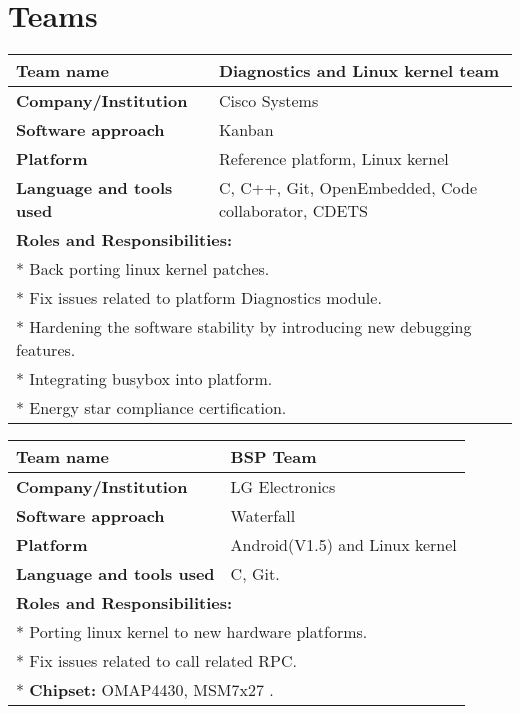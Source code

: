 \documentclass[letterpaper]{twentysecondcv} %
\begin{document}
\section{Teams}
\vspace{1mm}
\begin{tabular}{ |p{7cm}|p{13cm}| }
\hline
\rowcolor{sidecolor} 
\textbf{{\large Team name}} & \textbf{Diagnostics and Linux kernel team}\\[2ex]
\hline  
\rowcolor{sidecolor}
\textbf{{\large Company/Institution}} & Cisco Systems\\[2ex]

 \hline
 \textbf{{\large Software approach}} & Kanban \\[2ex]
 \hline
 \textbf{{\large Platform}} & Reference platform, Linux kernel \\[2ex]
 \hline
  \textbf{{\large Language and tools used}} & C, C++, Git, OpenEmbedded, Code collaborator, CDETS\\[2ex]
 \hline
 
 \multicolumn{2}{l}{
 \textbf{\large Roles and Responsibilities:}} \\[2ex]
 \multicolumn{2}{l}{
 	* Back porting linux kernel patches.}\\
 \multicolumn{2}{l}{
 	* Fix issues related to platform Diagnostics module.}\\
 \multicolumn{2}{l}{
 	* Hardening the software stability by introducing new debugging features.
 	}\\
 \multicolumn{2}{l}{
 	* Integrating busybox into platform.
 	}\\ 
\multicolumn{2}{l}{
 	* Energy star compliance certification.
 	}\\ 
 \hline
 \hline
 \end{tabular}
 \vspace{2mm}
 
 \begin{tabular}{ |p{7cm}|p{13cm}| }
\hline
\rowcolor{sidecolor} 
\textbf{{\large Team name}} & \textbf{BSP Team}\\[2ex]
 \hline
\rowcolor{sidecolor}
\textbf{{\large Company/Institution}} & LG Electronics\\[2ex]
 \hline
 \textbf{{\large Software approach}} & Waterfall \\[2ex]
 \hline
 \textbf{{\large Platform}} & Android(V1.5) and Linux kernel \\[2ex]
 \hline
  \textbf{{\large Language and tools used}} & C, Git.\\[2ex]
 \hline
 
 \multicolumn{2}{l}{
 \textbf{\large Roles and Responsibilities:}} \\[2ex]
 \multicolumn{2}{l}{
 	* Porting linux kernel to new hardware platforms.}\\
 \multicolumn{2}{l}{
 	* Fix issues related to call related RPC.}\\
 \multicolumn{2}{l}{
 	* \textbf{Chipset:} OMAP4430, MSM7x27 .
 	}\\
 \hline
 \hline
 \end{tabular}
 
\end{document}
